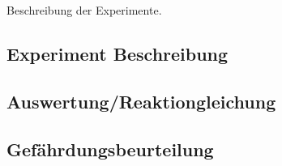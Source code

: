 Beschreibung der Experimente.

\subsection{Experiment Beschreibung}

\subsection{Auswertung/Reaktiongleichung}

\subsection{Gefährdungsbeurteilung}